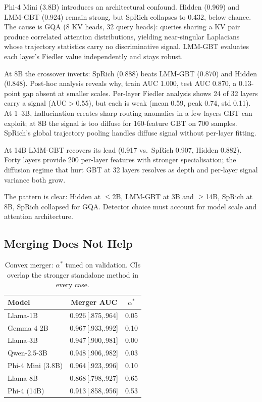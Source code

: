 \documentclass{article}
\begin{document}
Phi-4 Mini (3.8B) introduces an architectural confound.  Hidden (0.969)
and LMM-GBT (0.924) remain strong, but SpRich collapses to 0.432,
below chance.  The cause is GQA (8 KV heads, 32 query heads): queries
sharing a KV pair produce correlated attention distributions, yielding
near-singular Laplacians whose trajectory statistics carry no
discriminative signal.  LMM-GBT evaluates each layer's Fiedler value
independently and stays robust.

At 8B the crossover inverts: SpRich (0.888) beats LMM-GBT (0.870) and
Hidden (0.848).  Post-hoc analysis reveals why, train AUC 1.000,
test AUC 0.870, a 0.13-point gap absent at smaller scales.  Per-layer
Fiedler analysis shows 24 of 32 layers carry a signal (AUC${>}$0.55),
but each is weak (mean 0.59, peak 0.74, std 0.11).  At 1--3B,
hallucination creates sharp routing anomalies in a few layers GBT can
exploit; at 8B the signal is too diffuse for 160-feature GBT on 700
samples.  SpRich's global trajectory pooling handles diffuse signal
without per-layer fitting.

At 14B LMM-GBT recovers its lead (0.917 vs.\ SpRich 0.907, Hidden
0.882).  Forty layers provide 200 per-layer features with stronger
specialisation; the diffusion regime that hurt GBT at 32 layers
resolves as depth and per-layer signal variance both grow.

The pattern is clear: Hidden at ${\leq}$2B, LMM-GBT at 3B and
${\geq}$14B, SpRich at 8B, SpRich collapsed for GQA.  Detector choice
must account for model scale and attention architecture.

\subsection{Merging Does Not Help}

\begin{table}[t]
\centering
\setlength{\tabcolsep}{2pt}
\caption{Convex merger: $\alpha^*$ tuned on validation.  CIs overlap the
  stronger standalone method in every case.}
\label{tab:merger}
\footnotesize
\begin{tabular}{lcc}
\toprule
Model & Merger AUC & $\alpha^*$ \\
\midrule
Llama-1B          & 0.926\,\tiny{[.875,.964]} & 0.05 \\
Gemma 4 2B        & 0.967\,\tiny{[.933,.992]} & 0.10 \\
Llama-3B          & 0.947\,\tiny{[.900,.981]} & 0.00 \\
Qwen-2.5-3B      & 0.948\,\tiny{[.906,.982]} & 0.03 \\
Phi-4 Mini (3.8B) & 0.964\,\tiny{[.923,.996]} & 0.10 \\
Llama-8B          & 0.868\,\tiny{[.798,.927]} & 0.65 \\
Phi-4 (14B)       & 0.913\,\tiny{[.858,.956]} & 0.53 \\
\bottomrule
\end{tabular}
\end{table}
\end{document}

